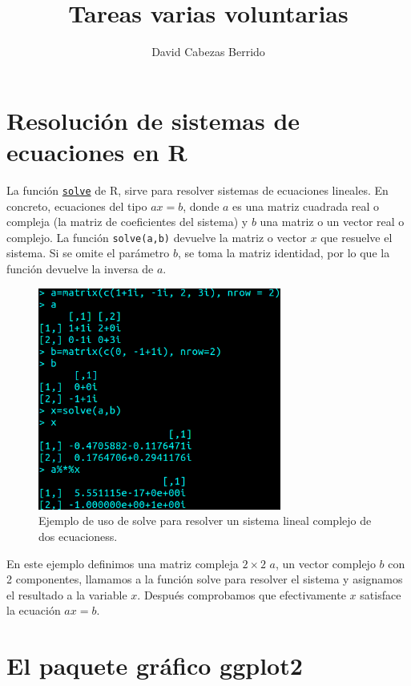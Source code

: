 \documentclass[12pt]{article}
\title{Tareas varias voluntarias}
\author{David Cabezas Berrido}
\date{}
\begin{document}
\maketitle

\section{Resolución de sistemas de ecuaciones en R}

La función
\href{https://www.rdocumentation.org/packages/base/versions/3.6.2/topics/solve}{\texttt{solve}}
de R, sirve para resolver sistemas de ecuaciones lineales. En
concreto, ecuaciones del tipo $ax=b$, donde $a$ es una matriz cuadrada
real o compleja (la matriz de coeficientes del sistema) y $b$ una
matriz o un vector real o complejo. La función \texttt{solve(a,b)}
devuelve la matriz o vector $x$ que resuelve el sistema. Si se omite
el parámetro $b$, se toma la matriz identidad, por lo que la función
devuelve la inversa de $a$.

\begin{figure}[H]
  \centering
  \includegraphics[width=80mm]{solve}
  \caption{Ejemplo de uso de solve para resolver un sistema lineal complejo de dos ecuacioness.}
\end{figure}

En este ejemplo definimos una matriz compleja $2\times 2$ $a$, un
vector complejo $b$ con 2 componentes, llamamos a la función solve
para resolver el sistema y asignamos el resultado a la variable
$x$. Después comprobamos que efectivamente $x$ satisface la ecuación
$ax=b$.

\section{El paquete gráfico ggplot2}
\end{document}
